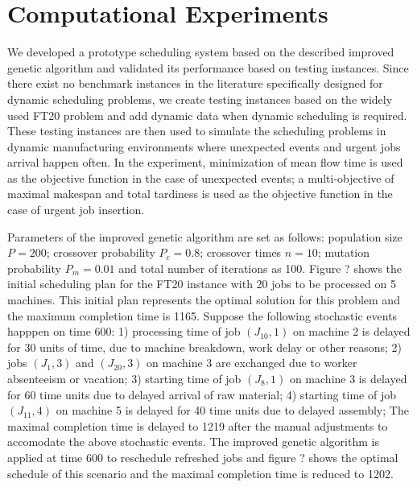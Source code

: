 \section{Computational Experiments}
We developed a prototype scheduling system based on the described improved genetic algorithm and validated its performance based on testing instances.
Since there exist no benchmark instances in the literature specifically designed for dynamic scheduling problems, we create testing instances based on the widely used FT20 problem and add dynamic data when dynamic scheduling is required.
These testing instances are then used to simulate the scheduling problems in dynamic manufacturing environments where unexpected events and urgent jobs arrival happen often.
In the experiment, minimization of mean flow time is used as the objective function in the case of unexpected events; a multi-objective of maximal makespan and total tardiness is used as the objective function in the case of urgent job insertion.

Parameters of the improved genetic algorithm are set as follows: population size $P = 200$; crossover probability $P_c = 0.8$; crossover times $n = 10$; mutation probability $P_m = 0.01$ and total number of iterations as 100.
Figure ? shows the initial scheduling plan for the FT20 instance with 20 jobs to be processed on 5 machines.
This initial plan represents the optimal solution for this problem and the maximum completion time is 1165.
Suppose the following stochastic events happpen on time 600: 1) processing time of job $(J_{10}, 1)$ on machine 2 is delayed for 30 units of time, due to machine breakdown, work delay or other reasons; 2) jobs $(J_1, 3)$ and $(J_{20}, 3)$ on machine 3 are exchanged due to worker absenteeism or vacation; 3) starting time of job $(J_8, 1)$ on machine 3 is delayed for 60 time units due to delayed arrival of raw material; 4) starting time of job $(J_11, 4)$ on machine 5 is delayed for 40 time units due to delayed assembly;
The maximal completion time is delayed to 1219 after the manual adjustments to accomodate the above stochastic events.
The improved genetic algorithm is applied at time 600 to reschedule refreshed jobs and figure ? shows the optimal schedule of this scenario and the maximal completion time is reduced to 1202.


